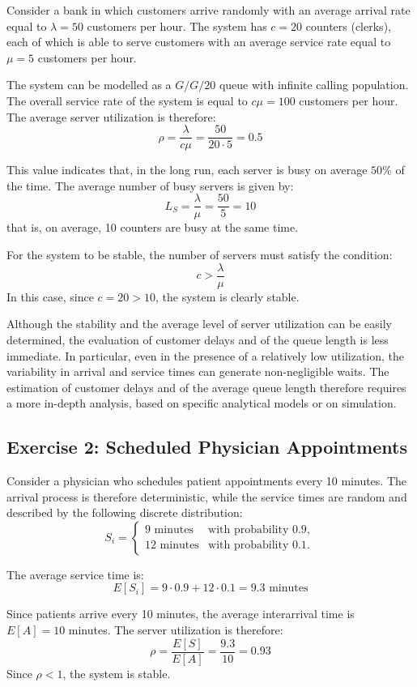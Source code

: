 Consider a bank in which customers arrive randomly with an average arrival rate equal to $\lambda = 50$ customers per hour. The system has $c = 20$ counters (clerks), each of which is able to serve customers with an average service rate equal to $\mu = 5$ customers per hour.

The system can be modelled as a $G/G/20$ queue with infinite calling population. The overall service rate of the system is equal to $c\mu = 100$ customers per hour. The average server utilization is therefore:
\[
\rho = \frac{\lambda}{c\mu} = \frac{50}{20 \cdot 5} = 0.5
\]

This value indicates that, in the long run, each server is busy on average $50\%$ of the time. The average number of busy servers is given by:
\[
L_S = \frac{\lambda}{\mu} = \frac{50}{5} = 10
\]
that is, on average, 10 counters are busy at the same time.

For the system to be stable, the number of servers must satisfy the condition:
\[
c > \frac{\lambda}{\mu}
\]
In this case, since $c = 20 > 10$, the system is clearly stable.

Although the stability and the average level of server utilization can be easily determined, the evaluation of customer delays and of the queue length is less immediate. In particular, even in the presence of a relatively low utilization, the variability in arrival and service times can generate non-negligible waits. The estimation of customer delays and of the average queue length therefore requires a more in-depth analysis, based on specific analytical models or on simulation.

\subsection{Exercise 2: Scheduled Physician Appointments}

Consider a physician who schedules patient appointments every 10 minutes. The arrival process is therefore deterministic, while the service times are random and described by the following discrete distribution:
\[
S_i =
\begin{cases}
9 \text{ minutes} & \text{with probability } 0.9, \\
12 \text{ minutes} & \text{with probability } 0.1.
\end{cases}
\]

The average service time is:
\[
E[S_i] = 9 \cdot 0.9 + 12 \cdot 0.1 = 9.3 \text{ minutes}
\]

Since patients arrive every 10 minutes, the average interarrival time is $E[A] = 10$ minutes. The server utilization is therefore:
\[
\rho = \frac{E[S]}{E[A]} = \frac{9.3}{10} = 0.93
\]
Since $\rho < 1$, the system is stable.

